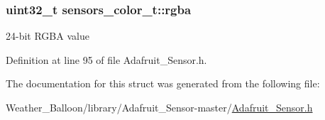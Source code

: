 \subsubsection[{\texorpdfstring{rgba}{rgba}}]{\setlength{\rightskip}{0pt plus 5cm}uint32\+\_\+t sensors\+\_\+color\+\_\+t\+::rgba}\hypertarget{structsensors__color__t_a0afbff980c17fbacdab1666735f3d3e6}{}\label{structsensors__color__t_a0afbff980c17fbacdab1666735f3d3e6}
24-\/bit R\+G\+BA value 

Definition at line 95 of file Adafruit\+\_\+\+Sensor.\+h.



The documentation for this struct was generated from the following file\+:\begin{DoxyCompactItemize}
\item 
Weather\+\_\+\+Balloon/library/\+Adafruit\+\_\+\+Sensor-\/master/\hyperlink{_adafruit___sensor_8h}{Adafruit\+\_\+\+Sensor.\+h}\end{DoxyCompactItemize}
